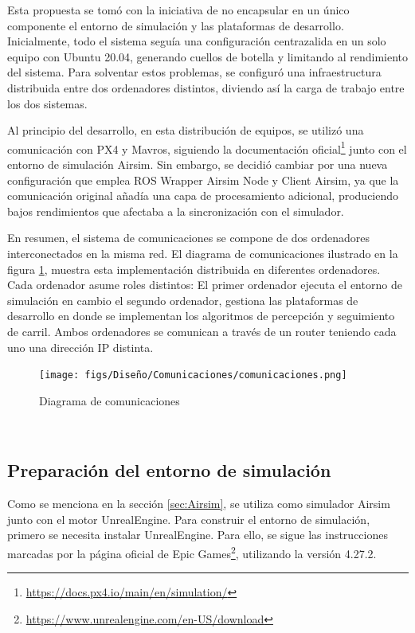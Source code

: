 Esta propuesta se tomó con la iniciativa de no encapsular en un único componente el entorno de simulación y las plataformas de desarrollo. Inicialmente, todo el sistema 
seguía una configuración centrazalida en un solo equipo con Ubuntu 20.04, generando cuellos de botella y limitando al rendimiento del sistema. Para solventar estos problemas, 
se configuró una infraestructura distribuida entre dos ordenadores distintos, diviendo así la carga de trabajo entre los dos sistemas. \newline

Al principio del desarrollo, en esta distribución de equipos, se utilizó una comunicación con PX4 y Mavros, siguiendo la documentación oficial\footnote{\url{https://docs.px4.io/main/en/simulation/}} 
junto con el entorno de simulación Airsim. Sin embargo, se decidió cambiar por una nueva configuración que emplea ROS Wrapper Airsim Node y Client Airsim, ya que 
la comunicación original añadía una capa de procesamiento adicional, produciendo bajos rendimientos que afectaba a la sincronización con el simulador. 

En resumen, el sistema de comunicaciones se compone de dos ordenadores interconectados en la misma red. El diagrama 
de comunicaciones ilustrado en la figura \ref{fig:diagramadeAirsim}, muestra esta implementación distribuida en diferentes ordenadores. Cada ordenador asume roles distintos: 
El primer ordenador ejecuta el entorno de simulación en cambio el segundo ordenador, gestiona las plataformas de desarrollo en donde se implementan los algoritmos 
de percepción y seguimiento de carril. Ambos ordenadores se comunican a través de un router teniendo cada uno una dirección IP distinta. 

\newpage
\begin{figure} [H]
  \begin{center}
    \texttt{[image: figs/Diseño/Comunicaciones/comunicaciones.png]}
  \end{center}
  \caption{Diagrama de comunicaciones}
  \label{fig:diagramadeAirsim}
\end{figure}\

\subsection{Preparación del entorno de simulación}
\label{sec:Preparación_entorno}

Como se menciona en la sección \ref{sec:Airsim}, se utiliza como simulador Airsim junto con el motor UnrealEngine. Para construir el entorno de simulación, primero
se necesita instalar UnrealEngine. Para ello, se sigue las instrucciones marcadas por la página oficial de Epic Games\footnote{\url{https://www.unrealengine.com/en-US/download}}, 
utilizando la versión 4.27.2.

